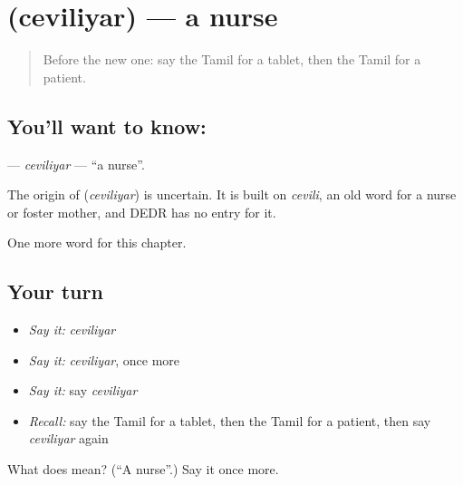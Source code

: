 \section[\texorpdfstring{\ta{செவிலியர்} (ceviliyar)}{செவிலியர் (ceviliyar)}]{ (ceviliyar) — a nurse}

\label{lesson:TA-C232-ceviliyar}



\begin{quote}
Before the new one: say the Tamil for a tablet, then the Tamil for a patient.
\end{quote}

\subsection*{You'll want to know: }
\textbf{} — \emph{ceviliyar} — \textquotedblleft{}a nurse\textquotedblright{}.

\begin{cousinweb}
The origin of \textbf{} (\emph{ceviliyar}) is uncertain. It is built on \emph{cevili}, an old word for a nurse or foster mother, and DEDR has no entry for it.
\end{cousinweb}

\begin{grammarlens}[title={What you've built}]
One more word for this chapter.
\end{grammarlens}

\subsection*{Your turn}
\begin{itemize}
\raggedright
  \item \emph{Say it:} \emph{ceviliyar}
  \item \emph{Say it:} \emph{ceviliyar}, once more
  \item \emph{Say it:} say \emph{ceviliyar}
  \item \emph{Recall:} say the Tamil for a tablet, then the Tamil for a patient, then say \emph{ceviliyar} again
\end{itemize}

\begin{tcolorbox}[breakable,colback=teal!4,colframe=teal!35!black,title={Before you move on}]
What does  mean? (\textquotedblleft{}A nurse\textquotedblright{}.) Say it once more.
\end{tcolorbox}
